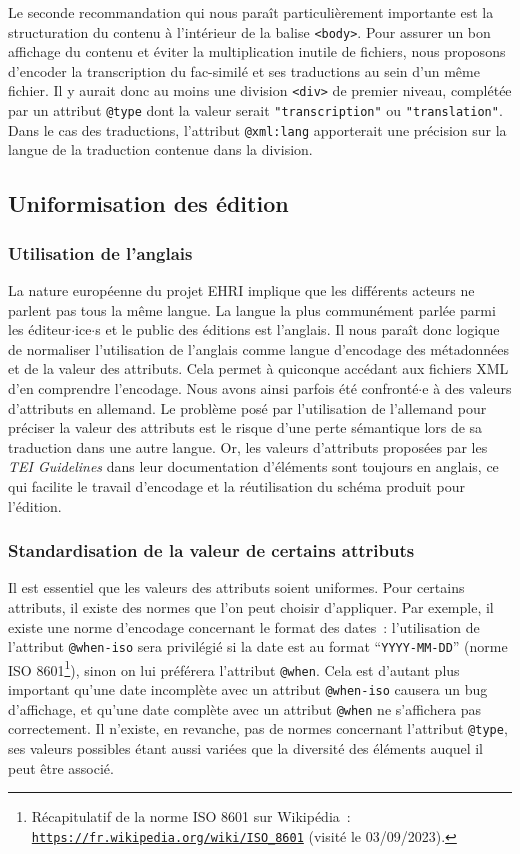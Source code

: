 Le seconde recommandation qui nous paraît particulièrement importante est la structuration du contenu à l'intérieur de la balise \texttt{<body>}. Pour assurer un bon affichage du contenu et éviter la multiplication inutile de fichiers, nous proposons d'encoder la transcription du fac-similé et ses traductions au sein d'un même fichier. Il y aurait donc au moins une division \texttt{<div>} de premier niveau, complétée par un attribut \texttt{@type} dont la valeur serait \texttt{"transcription"} ou \texttt{"translation"}. Dans le cas des traductions, l'attribut \texttt{@xml:lang} apporterait une précision sur la langue de la traduction contenue dans la division.


\subsection{Uniformisation des édition}

\subsubsection{Utilisation de l'anglais}
La nature européenne du projet EHRI implique que les différents acteurs ne parlent pas tous la même langue. La langue la plus communément parlée parmi les éditeur$\cdot$ice$\cdot$s et le public des éditions est l'anglais. Il nous paraît donc logique de normaliser l'utilisation de l'anglais comme langue d'encodage des métadonnées et de la valeur des attributs. Cela permet à quiconque accédant aux fichiers XML d'en comprendre l'encodage. Nous avons ainsi parfois été confronté$\cdot$e à des valeurs d'attributs en allemand. Le problème posé par l'utilisation de l'allemand pour préciser la valeur des attributs est le risque d'une perte sémantique lors de sa traduction dans une autre langue. Or, les valeurs d'attributs proposées par les \textit{TEI Guidelines} dans leur documentation d'éléments sont toujours en anglais, ce qui facilite le travail d'encodage et la réutilisation du schéma produit pour l'édition.

\subsubsection{Standardisation de la valeur de certains attributs}
Il est essentiel que les valeurs des attributs soient uniformes. Pour certains attributs, il existe des normes que l'on peut choisir d'appliquer. Par exemple, il existe une norme d'encodage concernant le format des dates~: l'utilisation de l'attribut \texttt{@when-iso} sera privilégié si la date est au format \enquote{\texttt{YYYY-MM-DD}} (norme ISO 8601\footnote{Récapitulatif de la norme ISO 8601 sur Wikipédia~: \texttt{\href{https://fr.wikipedia.org/wiki/ISO_8601}{https://fr.wikipedia.org/wiki/ISO\_{}8601}} (visité le 03/09/2023).}), sinon on lui préférera l'attribut \texttt{@when}. Cela est d'autant plus important qu'une date incomplète avec un attribut \texttt{@when-iso} causera un bug d'affichage, et qu'une date complète avec un attribut \texttt{@when} ne s'affichera pas correctement. Il n'existe, en revanche, pas de normes concernant l'attribut \texttt{@type}, ses valeurs possibles étant aussi variées que la diversité des éléments auquel il peut être associé.  

